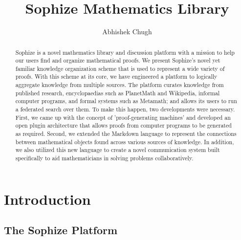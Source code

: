 \documentclass[runningheads]{llncs}
\begin{document}
%
\title{Sophize Mathematics Library}
%
%
\author{Abhishek Chugh}
%
%
%
\maketitle              %
%
\begin{abstract}
Sophize is a novel mathematics library and discussion platform with a mission to help our
users find and organize mathematical proofs. We present Sophize's novel yet familiar
knowledge organization scheme that is used to represent a wide variety of proofs. With this
scheme at its core, we have engineered a platform to logically aggregate knowledge from
multiple sources. The platform curates knowledge from published research, encyclopaedias
such as PlanetMath and Wikipedia, informal computer programs, and formal systems such as
Metamath; and allows its users to run a federated search over them. To make this happen, two
developments were necessary. First, we came up with the concept of 'proof-generating
machines' and developed an open plugin architecture that allows proofs from computer
programs to be generated as required. Second, we extended the Markdown language to represent
the connections between mathematical objects found across various sources of knowledge. In
addition, we also utilized this new language to create a novel communication system built
specifically to aid mathematicians in solving problems collaboratively.


\end{abstract}


\section{Introduction}

\subsection*{The Sophize Platform}
\end{document}
